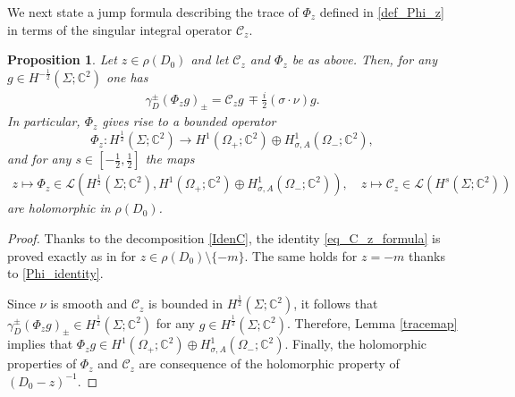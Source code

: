 \documentclass[11pt,a4paper,reqno,oneside]{amsproc}
\def \cc {{\mathbb C}}
\numberwithin{equation}{section}
\def \cc {{\mathbb{C}}}
\newtheorem{proposition}[definition]{Proposition}
\begin{document}
We next state a jump formula describing the trace of $\Phi_z$ defined in \eqref{def_Phi_z}  in terms of the singular integral operator $\mathscr{C}_{z}$.

\begin{proposition}\label{Further_Phi_z} Let $z\in\rho(D_0)$ and let  $\mathscr{C}_{z}$ and $\Phi_z$ be as above. Then, for any $g \in H^{-\frac{1}{2}}(\Sigma;\mathbb{C}^2)$ one has
			\begin{align}\label{eq_C_z_formula}
				\gamma_D^\pm(\Phi_z g)_\pm =    \mathscr{C}_zg   \,\mp \frac{i}{2}  (\sigma \cdot \nu)g. 
			\end{align}
 In particular, $\Phi_z$ gives rise to a bounded operator
 \[
 \Phi_z: H^{\frac{1}{2}}(\Sigma;\mathbb{C}^2)\longrightarrow H^1(\Omega_+;\mathbb{C}^2) \oplus H^1_{\sigma, A}(\Omega_-;\mathbb{C}^2),
 \]
 and for any $s\in[-\frac{1}{2},\frac{1}{2}]$ the maps 
\begin{align*} 
z \mapsto \Phi_z \in \mathcal L(H^{\frac{1}{2}}(\Sigma;\mathbb{C}^2), H^1(\Omega_+;\mathbb{C}^2) \oplus H^1_{\sigma, A}(\Omega_-;\mathbb{C}^2)),\quad   z \mapsto \mathscr C_z\in \mathcal L(H^{s}(\Sigma;\mathbb{C}^2)) 
\end{align*}
are holomorphic in $\rho(D_0)$.
\end{proposition}
\begin{proof}  Thanks to the decomposition  \eqref{IdenC},  the identity \eqref{eq_C_z_formula} is proved exactly as in \cite[Proposition 3.4]{BHOP20} for $z\in\rho(D_0)\setminus\{-m\}$. The same holds for $z=-m$ thanks to \eqref{Phi_identity}. 

Since $\nu$ is smooth and $\mathscr{C}_z$ is bounded in $H^{\frac{1}{2}}(\Sigma;\cc^2)$, it follows that $\gamma_D^\pm(\Phi_zg)_\pm\in H^{\frac{1}{2}}(\Sigma;\cc^2)$ for any $g\in H^{\frac{1}{2}}(\Sigma;\cc^2)$. Therefore, Lemma \ref{tracemap} implies that  $\Phi_zg\in H^1(\Omega_+;\mathbb{C}^2) \oplus H^1_{\sigma, A}(\Omega_-;\mathbb{C}^2)$. Finally, the holomorphic properties of $\Phi_z$ and $\mathscr C_z$ are consequence of the holomorphic property of $(D_0-z)^{-1}$.
\end{proof}
\end{document}

